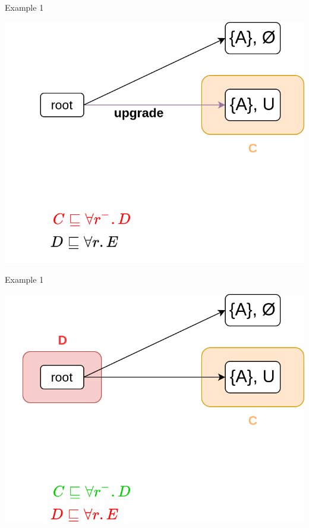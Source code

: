 \documentclass[10pt]{beamer}
\begin{document}
\begin{frame}[fragile]{Example 1}
  \begin{center}
  \includegraphics[scale=.3]{img/ex1_1.png}
  \end{center}
\end{frame}

\begin{frame}[fragile]{Example 1}
  \begin{center}
  \includegraphics[scale=.3]{img/ex1_2.png}
  \end{center}
\end{frame}
\end{document}
